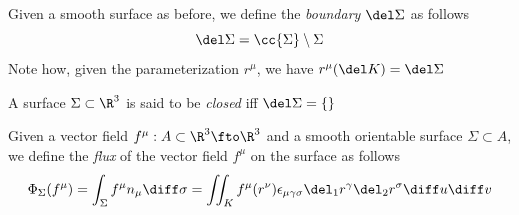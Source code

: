\documentclass[../mmf.tex]{subfiles}
\begin{document}
\begin{dfn}
	Given a smooth surface as before, we define the \textit{boundary} $\del\Sigma$ as follows
	\begin{equation}
		\del\Sigma=\cc{\Sigma}\setminus\Sigma
		\label{eq:boundarysurf}
	\end{equation}
	Note how, given the parameterization $r^\mu$, we have $r^\mu(\del K)=\del\Sigma$
\end{dfn}
\begin{dfn}
	A surface $\Sigma\subset\R^3$ is said to be \textit{closed} iff $\del\Sigma=\{\}$
\end{dfn}
\begin{dfn}[Flux]
	Given a vector field $f^\mu:A\subset\R^3\fto\R^3$ and a smooth orientable surface $\Sigma\subset A$, we define the \textit{flux} of the vector field $f^\mu$ on the surface as follows
	\begin{equation}
		\Phi_\Sigma(f^\mu)=\int_\Sigma f^\mu n_\mu\diff\sigma=\iint_Kf^\mu(r^\nu)\epsilon_{\mu\gamma\sigma}\del_1r^\gamma\del_2r^\sigma\diff u\diff v
		\label{eq:flux}
	\end{equation}
\end{dfn}
\end{document}
